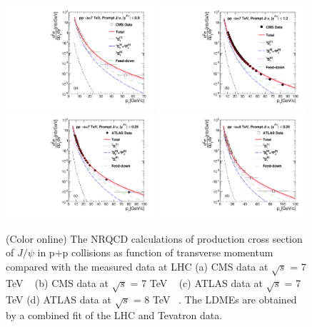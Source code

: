 \documentclass[aps,prc,preprint,superscriptaddress,showpacs,showkeys,amsmath]{revtex4-1}
\begin{document}
\begin{figure}
\includegraphics[width=0.49\textwidth]{Figures/JPsi/CMS_New_D2NDPtDy_PromptJPsi_Y0009_Pt.pdf}
\includegraphics[width=0.49\textwidth]{Figures/JPsi/CMS_Latest_D2NDPtDy_PromptJPsi_Y0012_Pt.pdf}
\includegraphics[width=0.49\textwidth]{Figures/JPsi/ATLAS_7TeV_D2NDPtDy_PromptJPsi_Y0025_Pt.pdf}
\includegraphics[width=0.49\textwidth]{Figures/JPsi/ATLAS_8TeV_D2NDPtDy_PromptJPsi_Y0025_Pt.pdf}
\caption{(Color online) The NRQCD calculations of production cross section of $J/\psi$ in p+p collisions 
  as function of transverse momentum compared with the measured data at LHC 
  (a) CMS data at $\sqrt{s}$ = 7 TeV ~\cite{Chatrchyan:2011kc} 
  (b) CMS data at $\sqrt{s}$ = 7 TeV ~\cite{Khachatryan:2015rra} 
  (c) ATLAS data at $\sqrt{s}$ = 7 TeV 
  (d) ATLAS data at $\sqrt{s}$ = 8 TeV ~\cite{Aad:2015duc}. 
  The LDMEs are obtained by a combined fit of the LHC and Tevatron data.
}
\label{Fig:LDMEJPsi}
\end{figure}
\end{document}
